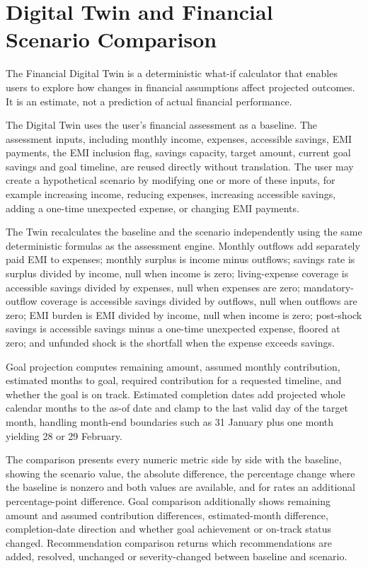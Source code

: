 \section{Digital Twin and Financial Scenario Comparison}

The Financial Digital Twin is a deterministic what-if calculator that enables users to explore how changes in financial assumptions affect projected outcomes. It is an estimate, not a prediction of actual financial performance.

The Digital Twin uses the user's financial assessment as a baseline. The assessment inputs, including monthly income, expenses, accessible savings, EMI payments, the EMI inclusion flag, savings capacity, target amount, current goal savings and goal timeline, are reused directly without translation. The user may create a hypothetical scenario by modifying one or more of these inputs, for example increasing income, reducing expenses, increasing accessible savings, adding a one-time unexpected expense, or changing EMI payments.

The Twin recalculates the baseline and the scenario independently using the same deterministic formulas as the assessment engine. Monthly outflows add separately paid EMI to expenses; monthly surplus is income minus outflows; savings rate is surplus divided by income, null when income is zero; living-expense coverage is accessible savings divided by expenses, null when expenses are zero; mandatory-outflow coverage is accessible savings divided by outflows, null when outflows are zero; EMI burden is EMI divided by income, null when income is zero; post-shock savings is accessible savings minus a one-time unexpected expense, floored at zero; and unfunded shock is the shortfall when the expense exceeds savings.

Goal projection computes remaining amount, assumed monthly contribution, estimated months to goal, required contribution for a requested timeline, and whether the goal is on track. Estimated completion dates add projected whole calendar months to the as-of date and clamp to the last valid day of the target month, handling month-end boundaries such as 31 January plus one month yielding 28 or 29 February.

The comparison presents every numeric metric side by side with the baseline, showing the scenario value, the absolute difference, the percentage change where the baseline is nonzero and both values are available, and for rates an additional percentage-point difference. Goal comparison additionally shows remaining amount and assumed contribution differences, estimated-month difference, completion-date direction and whether goal achievement or on-track status changed. Recommendation comparison returns which recommendations are added, resolved, unchanged or severity-changed between baseline and scenario.

